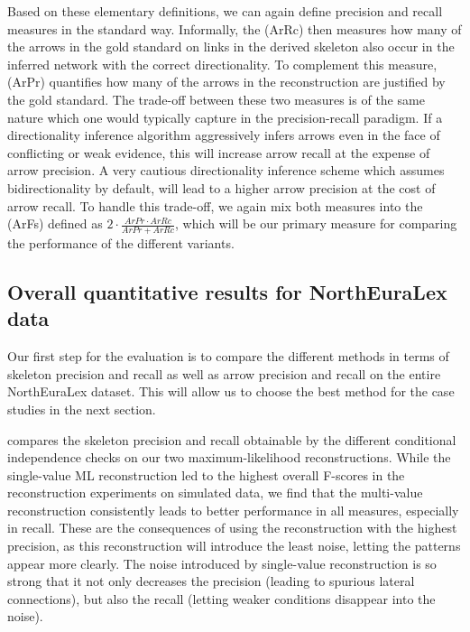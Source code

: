 \largerpage
Based on these elementary definitions, we can again define precision and recall measures in the standard way. Informally, the \textit{} (ArRc) then measures how many of the arrows in the gold standard on links in the derived skeleton also occur in the inferred network with the correct directionality. To complement this measure, \textit{} (ArPr) quantifies how many of the arrows in the reconstruction are justified by the gold standard. The trade-off between these two measures is of the same nature which one would typically capture in the precision-recall paradigm. If a directionality inference algorithm aggressively infers arrows even in the face of conflicting or weak evidence, this will increase arrow recall at the expense of arrow precision. A very cautious directionality inference scheme which assumes bidirectionality by default, will lead to a higher arrow precision at the cost of arrow recall. To handle this trade-off, we again mix both measures into the \textit{} (ArFs) defined as $2 \cdot \frac{ArPr \cdot ArRc}{ArPr+ArRc}$, which will be our primary measure for comparing the performance of the different variants.

\subsection{Overall quantitative results for NorthEuraLex data}
Our first step for the evaluation is to compare the different methods in terms of skeleton precision and recall as well as arrow precision and recall on the entire NorthEuraLex dataset. This will allow us to choose the best method for the case studies in the next section.

 compares the skeleton precision and recall obtainable by the different conditional independence checks on our two maximum-likelihood reconstructions. While the single-value ML reconstruction led to the highest overall F-scores in the reconstruction experiments on simulated data, we find that the multi-value reconstruction consistently leads to better performance in all measures, especially in recall. These are the consequences of using the reconstruction with the highest precision, as this reconstruction will introduce the least noise, letting the patterns appear more clearly. The noise introduced by single-value reconstruction is so strong that it not only decreases the precision (leading to spurious lateral connections), but also the recall (letting weaker conditions disappear into the noise).

